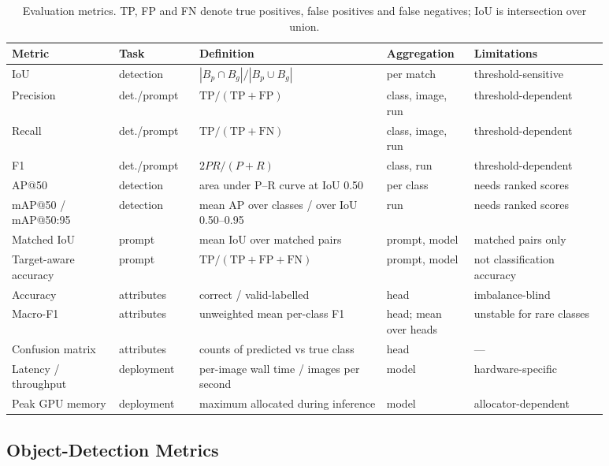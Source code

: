 \begin{table}[htbp]
\centering
\caption{Evaluation metrics. TP, FP and FN denote true positives, false positives and false negatives; IoU is intersection over union.}
\label{tab:metrics}
\footnotesize
\begin{tabular}{p{0.16\linewidth}p{0.12\linewidth}p{0.28\linewidth}p{0.12\linewidth}p{0.20\linewidth}}
\hline
\textbf{Metric} & \textbf{Task} & \textbf{Definition} & \textbf{Aggregation} & \textbf{Limitations} \\
\hline
IoU & detection & $|B_p \cap B_g| / |B_p \cup B_g|$ & per match & threshold-sensitive \\
Precision & det./prompt & $\mathrm{TP}/(\mathrm{TP}+\mathrm{FP})$ & class, image, run & threshold-dependent \\
Recall & det./prompt & $\mathrm{TP}/(\mathrm{TP}+\mathrm{FN})$ & class, image, run & threshold-dependent \\
F1 & det./prompt & $2PR/(P+R)$ & class, run & threshold-dependent \\
AP@50 & detection & area under P--R curve at IoU 0.50 & per class & needs ranked scores \\
mAP@50 / mAP@50:95 & detection & mean AP over classes / over IoU 0.50--0.95 & run & needs ranked scores \\
Matched IoU & prompt & mean IoU over matched pairs & prompt, model & matched pairs only \\
Target-aware accuracy & prompt & $\mathrm{TP}/(\mathrm{TP}+\mathrm{FP}+\mathrm{FN})$ & prompt, model & not classification accuracy \\
Accuracy & attributes & correct / valid-labelled & head & imbalance-blind \\
Macro-F1 & attributes & unweighted mean per-class F1 & head; mean over heads & unstable for rare classes \\
Confusion matrix & attributes & counts of predicted vs true class & head & --- \\
Latency / throughput & deployment & per-image wall time / images per second & model & hardware-specific \\
Peak GPU memory & deployment & maximum allocated during inference & model & allocator-dependent \\
\hline
\end{tabular}
\end{table}

\subsection{Object-Detection Metrics}

